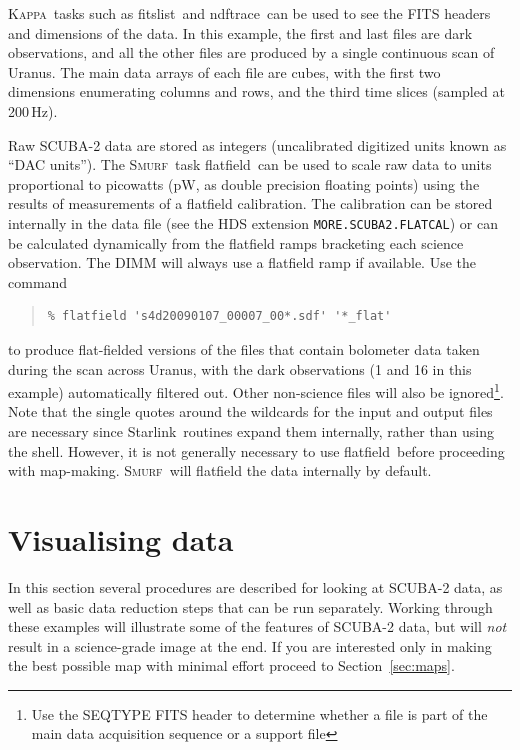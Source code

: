 \documentclass[twoside,11pt]{article}
\newcommand{\htmladdnormallink}[2]{#1}
\newcommand{\xref}[3]{#1}
\newcommand{\xlabel}[1]{}
\renewcommand{\_}{\texttt{\symbol{95}}}
\newenvironment{myquote}{\begin{quote}\begin{small}}{\end{small}\end{quote}}
\newcommand{\starlink}{\htmladdnormallink{Starlink}{http://starlink.jach.hawaii.edu}}
\newcommand{\Kappa}{\xref{\textsc{Kappa}}{sun95}{}}
\newcommand{\smurf}{\xref{\textsc{Smurf}}{sun258}{}}
\newcommand{\task}[1]{\textsf{#1}}
\newcommand{\flatfield}{\xref{\task{flatfield}}{sun258}{FLATFIELD}}
\newcommand{\fitslist}{\xref{\task{fitslist}}{sun95}{FITSLIST}}
\newcommand{\ndftrace}{\xref{\task{ndftrace}}{sun95}{NDFTRACE}}
\begin{document}
\Kappa\ tasks such as \fitslist\ and \ndftrace\ can be used to see the
FITS headers and dimensions of the data. In this example, the first
and last files are dark observations, and all the other files are
produced by a single continuous scan of Uranus. The main data arrays
of each file are cubes, with the first two dimensions enumerating
columns and rows, and the third time slices (sampled at 200\,Hz).

Raw SCUBA-2 data are stored as integers (uncalibrated digitized units
known as ``DAC units''). The \smurf\ task \flatfield\ can be used to
scale raw data to units proportional to picowatts (pW, as double
precision floating points) using the results of measurements of a
flatfield calibration. The calibration can be stored internally in the
data file (see the HDS extension \texttt{MORE.SCUBA2.FLATCAL}) or can
be calculated dynamically from the flatfield ramps bracketing each
science observation. The DIMM will always use a flatfield ramp if
available. Use the command

\begin{myquote}
\begin{verbatim}
% flatfield 's4d20090107_00007_00*.sdf' '*_flat'
\end{verbatim}
\end{myquote}
%
to produce flat-fielded versions of the files that contain bolometer
data taken during the scan across Uranus, with the dark observations
(1 and 16 in this example) automatically filtered out. Other
non-science files will also be ignored\footnote{Use the SEQ\_TYPE FITS
  header to determine whether a file is part of the main data
  acquisition sequence or a support file}. Note that the single quotes
around the wildcards for the input and output files are necessary
since \starlink\ routines expand them internally, rather than using
the shell. However, it is not generally necessary to use \flatfield\
before proceeding with map-making. \smurf\ will flatfield the data
internally by default.

\section{\xlabel{time_series}Visualising data}
\label{sec:visual}

In this section several procedures are described for looking at
SCUBA-2 data, as well as basic data reduction steps that can be run
separately. Working through these examples will illustrate some of the
features of SCUBA-2 data, but will {\em not} result in a science-grade
image at the end. If you are interested only in making the best
possible map with minimal effort proceed to Section~\ref{sec:maps}.
\end{document}
